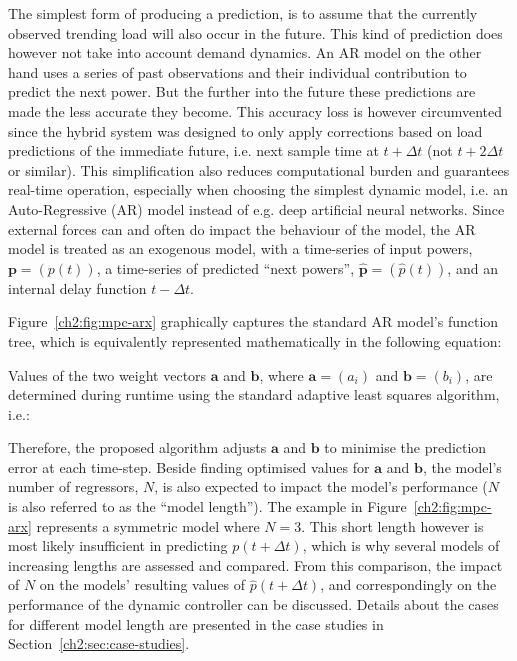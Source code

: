 The simplest form of producing a prediction, is to assume that the currently observed trending load will also occur in the future.
This kind of prediction does however not take into account demand dynamics.
%
%
%
An AR model on the other hand uses a series of past observations and their individual contribution to predict the next power.
But the further into the future these predictions are made the less accurate they become.
This accuracy loss is however circumvented since the hybrid system was designed to only apply corrections based on load predictions of the immediate future, i.e. next sample time at $t+\Delta t$ (not $t+2\Delta t$ or similar).
This simplification also reduces computational burden and guarantees real-time operation, especially when choosing the simplest dynamic model, i.e. an Auto-Regressive (AR) model instead of e.g. deep artificial neural networks.
Since external forces can and often do impact the behaviour of the model, the AR model is treated as an exogenous model, with a time-series of input powers, $\textbf{p} = (p(t))$, a time-series of predicted ``next powers'', $\hat{\textbf{p}} = (\hat{p}(t))$, and an internal delay function $t-\Delta t$.



Figure~\ref{ch2:fig:mpc-arx} graphically captures the standard AR model's function tree, which is equivalently represented mathematically in the following equation:



Values of the two weight vectors $\textbf{a}$ and $\textbf{b}$, where $\textbf{a} = (a_i)$ and $\textbf{b} = (b_i)$, are determined during runtime using the standard adaptive least squares algorithm, i.e.:



Therefore, the proposed algorithm adjusts $\textbf{a}$ and $\textbf{b}$ to minimise the prediction error at each time-step.
Beside finding optimised values for $\textbf{a}$ and $\textbf{b}$, the model's number of regressors, $N$, is also expected to impact the model's performance ($N$ is also referred to as the ``model length'').
The example in Figure~\ref{ch2:fig:mpc-arx} represents a symmetric model where $N=3$.
This short length however is most likely insufficient in predicting $p(t+\Delta t)$, which is why several models of increasing lengths are assessed and compared.
From this comparison, the impact of $N$ on the models' resulting values of $\hat{p}(t+\Delta t)$, and correspondingly on the performance of the dynamic controller can be discussed.
Details about the cases for different model length are presented in the case studies in Section~\ref{ch2:sec:case-studies}.










